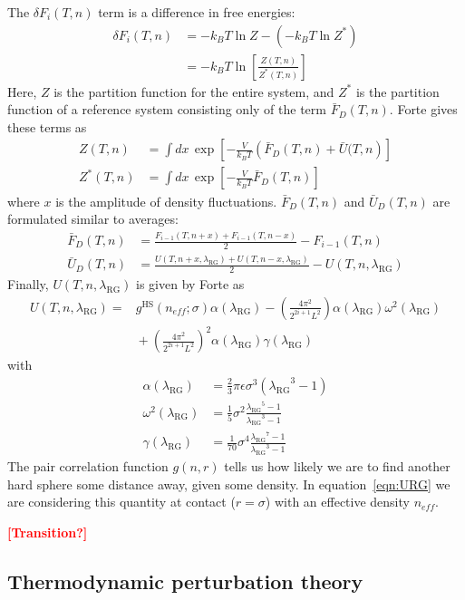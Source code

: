 \documentclass[letterpaper,twocolumn,amsmath,amssymb,prb]{revtex4-1}
\newcommand{\kT}{\ensuremath{k_BT}}
\newcommand{\lambdaRG}{\ensuremath{\lambda_\text{RG}}}
\newcommand{\1}{\ensuremath{\textbf{r}_1}}
\newcommand{\2}{\ensuremath{\textbf{r}_2}}
\newcommand{\3}{\ensuremath{\textbf{r}_3}}
\newcommand{\4}{\ensuremath{\textbf{r}_4}}
\newcommand{\FbarD}{\ensuremath{\bar{F}_D(T,n)}}
\newcommand{\UbarD}{\ensuremath{\bar{U}_D(T,n)}}
\newcommand{\fixme}[1]{\textcolor{red}{\textbf{[#1]}}}
\begin{document}
The $\delta F_i(T,n)$ term is a difference in free energies:
\begin{align}
  \delta F_i(T,n) &= -\kT\ln Z - \left( -\kT\ln Z^* \right) \nonumber \\
  &= -\kT\ln\left[ \frac{Z(T,n)}{Z^*(T,n)} \right]
\end{align}
Here, $Z$ is the partition function for the entire system, and $Z^*$
is the partition function of a reference system consisting only of the
term $\FbarD$. Forte gives these terms as
\begin{align}
  Z(T,n) &= \int dx\, \exp\left[ -\frac{V}{\kT}\left( \FbarD + \bar{U}(T,n \right) \right] \label{eqn:Z} \\
  Z^*(T,n) &= \int dx\, \exp\left[ -\frac{V}{\kT}\FbarD \right] \label{eqn:Zstar}
\end{align}
where $x$ is the amplitude of density fluctuations. $\FbarD$ and $\UbarD$ are formulated similar to averages:
\begin{align}
  \FbarD &= \frac{F_{i-1}(T,n+x) + F_{i-1}(T,n-x)}{2} - F_{i-1}(T,n) \\
  \UbarD &= \frac{U(T,n+x,\lambdaRG) + U(T,n-x,\lambdaRG)}{2} - U(T,n,\lambdaRG)
\end{align}
Finally, $U(T,n,\lambdaRG)$ is given by Forte as
\begin{align}
  U(T,n,\lambdaRG) = &{} g^\text{HS}(n_{eff};\sigma)\alpha(\lambdaRG) - \left( \frac{4\pi^2}{2^{2i+1}L^2} \right)\alpha(\lambdaRG)\omega^2(\lambdaRG) \nonumber \\
  &{} + \left( \frac{4\pi^2}{2^{2i+1}L^2} \right)^2\alpha(\lambdaRG)\gamma(\lambdaRG) \label{eqn:URG} %
\end{align}
with
\begin{align}
  \alpha(\lambdaRG) &= \frac{2}{3}\pi\epsilon\sigma^3(\lambdaRG^3 - 1) \\
  \omega^2(\lambdaRG) &= \frac{1}{5}\sigma^2\frac{\lambdaRG^5 - 1}{\lambdaRG^3 - 1} \\
  \gamma(\lambdaRG) &= \frac{1}{70}\sigma^4\frac{\lambdaRG^7 - 1}{\lambdaRG^3 - 1}
\end{align}
The pair correlation function $g(n,r)$ tells us how likely we are to
find another hard sphere some distance away, given some density. In
equation~\ref{eqn:URG} we are considering this quantity at contact ($r
= \sigma$) with an effective density $n_{eff}$.

\fixme{Transition?}

\subsection{Thermodynamic perturbation theory}\label{subsec:TPT}
\end{document}
